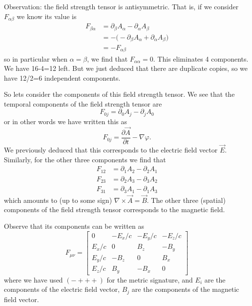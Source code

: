 Observation: the field strength tensor is antisymmetric. That is,
if we consider $F_{\alpha\beta}$ we know its value is
\begin{subequations}
\begin{align}
F_{\beta\alpha} &= \partial_{\beta}A_{\alpha} -
\partial_{\alpha}A_{\beta}\\
&= -\Big(-\partial_{\beta}A_{\alpha} +
\partial_{\alpha}A_{\beta}\Big)\\
&= -F_{\alpha\beta}
\end{align}
\end{subequations}
so in particular when $\alpha=\beta$, we find that
$F_{\alpha\alpha}=0$. This eliminates 4 components. We have 16-4=12
left. But we just deduced that there are duplicate copies, so we
have 12/2=6 independent components.

So lets consider the components of this field strength tensor. We
see that the temporal components of the field strength tensor are
\begin{equation}%
F_{0j} = \partial_{0}A_{j} - \partial_{j}A_{0}
\end{equation}
or in other words we have written this as
\begin{equation}%
F_{0j} =  \frac{\partial\vec{A}}{\partial t} - \nabla\varphi .
\end{equation}
We previously deduced that this corresponds to the electric field
vector $\vec{E}$. Similarly, for the other three components we
find that
\begin{subequations}
\begin{align}
F_{12} &= \partial_{1}A_{2} - \partial_{2}A_{1}\\
F_{23} &= \partial_{2}A_{3} - \partial_{3}A_{2}\\
F_{31} &= \partial_{3}A_{1} - \partial_{1}A_{3}
\end{align}
\end{subequations}
which amounts to (up to some sign)
$\nabla\times\vec{A}=\vec{B}$. The other three (spatial) components of the
field strength tensor corresponds to the magnetic field.

Observe that its components can be written as
\begin{equation}%
F_{\mu\nu} = \begin{bmatrix} 
  0    & -E_x/c & -E_y/c & -E_z/c \\
 E_x/c & 0      & B_z    & -B_y   \\ 
 E_y/c & -B_z   & 0      & B_x    \\ 
 E_z/c & B_y & -B_x & 0 \end{bmatrix}
\end{equation}
where we have used $(-+++)$ for the metric signature, and $E_{i}$
are the components of the electric field vector, $B_{j}$ are the
components of the magnetic field vector.

